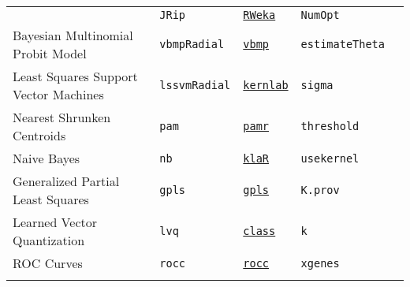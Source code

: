 \documentclass[12pt]{article}
\begin{document}
\begin{landscape}
\begin{longtable}{lllll}
        &
         \texttt{JRip} & 
           {\tt \href{http://cran.r-project.org/web/packages/RWeka/index.html}{RWeka}}    & 
            \texttt{NumOpt}   \\

\rowcolor[rgb]{.95, .95, .95}                     
      Bayesian Multinomial Probit Model  
      & \texttt{vbmpRadial} 
      &  {\tt \href{http://cran.r-project.org/web/packages/vbmp/index.html}{vbmp}} 
      & \texttt{estimateTheta} \\
      
      Least Squares Support Vector Machines &
         \texttt{lssvmRadial} & 
             {\tt \href{http://cran.r-project.org/web/packages/kernlab/index.html}{kernlab}}      & 
            \texttt{sigma} \\             
       
\rowcolor[rgb]{.95, .95, .95}                
      Nearest Shrunken Centroids&
         \texttt{pam} & 
             {\tt \href{http://cran.r-project.org/web/packages/pamr/index.html}{pamr}}        & 
            \texttt{threshold} \\  
       
      Naive Bayes &
         \texttt{nb} & 
            {\tt \href{http://cran.r-project.org/web/packages/klaR/index.html}{klaR}}     & 
            \texttt{usekernel} \\
        
\rowcolor[rgb]{.95, .95, .95}                 
      Generalized Partial Least Squares&
         \texttt{gpls} & 
             {\tt \href{http://cran.r-project.org/web/packages/gpls/index.html}{gpls}}      & 
            \texttt{K.prov} \\
      
      Learned Vector  Quantization&
         \texttt{lvq} & 
             {\tt \href{http://cran.r-project.org/web/packages/class/index.html}{class}}       &          
            \texttt{k} \\  
     
\rowcolor[rgb]{.95, .95, .95}              
      ROC Curves &
         \texttt{rocc} & 
             {\tt \href{http://cran.r-project.org/web/packages/rocc/index.html}{rocc}}    &          
            \texttt{xgenes} \\                 
\label{label-name}
\end{longtable}
\end{landscape}
\pagestyle{fancy}
\end{document}

